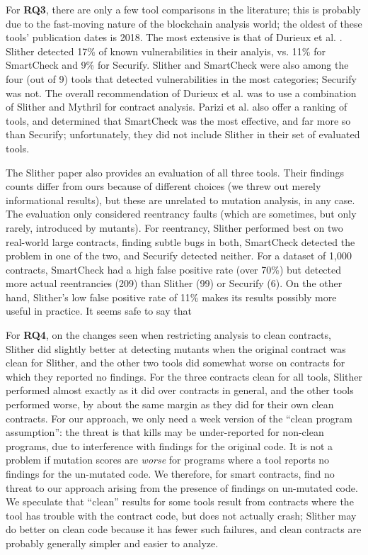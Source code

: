 For {\bf RQ3}, there are only a few tool comparisons in the literature; this is probably due to the fast-moving nature of the blockchain analysis world; the oldest of these tools' publication dates is 2018.  The most extensive is that of Durieux et al. \cite{durieux2019empirical}.  Slither detected 17\% of known vulnerabilities in their analyis, vs. 11\% for SmartCheck and 9\% for Securify. Slither and SmartCheck were also among the four (out of 9) tools that detected vulnerabilities in the most categories; Securify was not.  The overall recommendation of Durieux et al. was to use a combination of Slither and Mythril \cite{mythril-code} for contract analysis.  Parizi et al. \cite{Parizi} also offer a ranking of tools, and determined that SmartCheck was the most effective, and far more so than Securify; unfortunately, they did not include Slither in their set of evaluated tools.

The Slither paper \cite{slither} also provides an evaluation of all three tools.  Their findings counts differ from ours because of different choices (we threw out merely informational results), but these are unrelated to mutation analysis, in any case.  The evaluation only considered reentrancy faults \cite{SurveyAttacks,FC20} (which are sometimes, but only rarely, introduced by mutants).  For reentrancy, Slither performed best on two real-world large contracts, finding subtle bugs in both, SmartCheck detected the problem in one of the two, and Securify detected neither.  For a dataset of 1,000 contracts, SmartCheck had a high false positive rate (over 70\%) but detected more actual reentrancies (209) than Slither (99) or Securify (6).  On the other hand, Slither's low false positive rate of 11\%  makes its results possibly more useful in practice.  It seems safe to say that 

For {\bf RQ4}, on the changes seen when restricting analysis to clean contracts, Slither did slightly better at detecting mutants when the original contract was clean for Slither, and the other two tools did somewhat worse on contracts for which they reported no findings.  For the three contracts clean for all tools, Slither performed almost exactly as it did over contracts in general, and the other tools performed worse, by about the same margin as they did for their own clean contracts.  For our approach, we only need a week version of the ``clean program assumption'':  the threat is that kills may be under-reported for non-clean programs, due to interference with findings for the original code.  It is not a problem if mutation scores are \emph{worse} for programs where a tool reports no findings for the un-mutated code.  We therefore, for smart contracts, find no threat to our approach arising from the presence of findings on un-mutated code.  We speculate that ``clean'' results for some tools result from contracts where the tool has trouble with the contract code, but does not actually crash; Slither may do better on clean code because it has fewer such failures, and clean contracts are probably generally simpler and easier to analyze.


